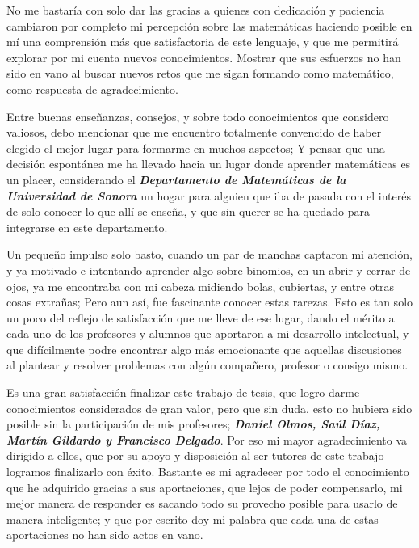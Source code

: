 \begin{center}
\vspace{30pt}
\parbox{1.0\linewidth}{
	No me bastaría con solo dar las gracias a quienes con dedicación y paciencia cambiaron por completo mi percepción sobre las matemáticas haciendo posible en mí una comprensión más que satisfactoria de este lenguaje, y que me permitirá explorar por mi cuenta nuevos conocimientos. Mostrar que sus esfuerzos no han sido en vano al buscar nuevos retos que me sigan formando como matemático, como respuesta de agradecimiento.

\vspace{6pt}
	Entre buenas enseñanzas, consejos, y sobre todo conocimientos que considero valiosos, debo mencionar que me encuentro totalmente convencido de haber elegido el mejor lugar para formarme en muchos aspectos; Y pensar que una decisión espontánea me ha llevado hacia un lugar donde aprender matemáticas es un placer,  considerando el \textbf{\textit{Departamento de Matemáticas de la Universidad de Sonora}} un hogar para alguien que iba de pasada con el interés de solo conocer lo que allí se enseña, y que sin querer se ha quedado para integrarse en este departamento.

\vspace{6pt}	
	Un pequeño impulso solo basto, cuando un par de manchas captaron mi atención, y ya motivado e intentando aprender algo sobre binomios, en un abrir y cerrar de ojos, ya me encontraba con mi cabeza midiendo bolas, cubiertas, y entre otras cosas extrañas; Pero aun así, fue fascinante conocer estas rarezas. Esto es tan solo un poco del reflejo de satisfacción que me lleve de ese lugar, dando el mérito a cada uno de los profesores y alumnos que aportaron a mi desarrollo intelectual, y que difícilmente podre encontrar algo más emocionante que aquellas discusiones al plantear y resolver problemas con algún compañero, profesor o consigo mismo.

\vspace{6pt}
	Es una gran satisfacción finalizar este trabajo de tesis, que logro darme conocimientos considerados de gran valor, pero que sin duda, esto no hubiera sido posible sin la participación de mis profesores; \textbf{\textit{Daniel Olmos, Saúl Díaz, Martín Gildardo y Francisco Delgado}}. Por eso mi mayor agradecimiento va dirigido a ellos, que por su apoyo y disposición al ser tutores de este trabajo logramos finalizarlo con éxito. Bastante es mi agradecer por todo el conocimiento que he adquirido gracias a sus aportaciones, que lejos de poder compensarlo, mi mejor manera de responder es sacando todo su provecho posible para usarlo de manera inteligente; y que por escrito doy mi palabra que cada una de estas aportaciones no han sido actos en vano.
}


\end{center}

